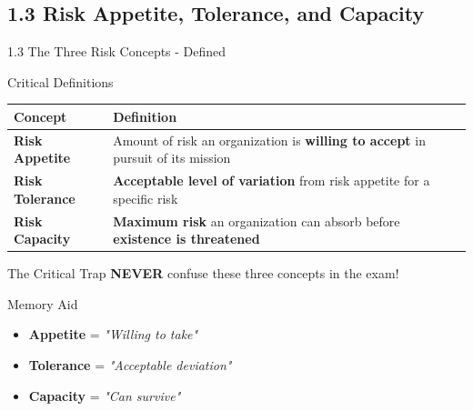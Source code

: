 \documentclass[10pt]{beamer}  %
\begin{document}
	\subsection{1.3 Risk Appetite, Tolerance, and Capacity}
	\begin{frame}{1.3 The Three Risk Concepts - Defined}
		\begin{block}{Critical Definitions}
			\begin{tabular}{|p{2.5cm}|p{8.5cm}|}
				\hline
				\textbf{Concept} & \textbf{Definition} \\
				\hline
				\textbf{Risk Appetite} & Amount of risk an organization is \textbf{willing to accept} in pursuit of its mission \\
				\hline
				\textbf{Risk Tolerance} & \textbf{Acceptable level of variation} from risk appetite for a specific risk \\
				\hline
				\textbf{Risk Capacity} & \textbf{Maximum risk} an organization can absorb before \textbf{existence is threatened} \\
				\hline
			\end{tabular}
		\end{block}
		
		\begin{alertblock}{The Critical Trap}
			\textbf{NEVER} confuse these three concepts in the exam!
		\end{alertblock}
		
		\begin{exampleblock}{Memory Aid}
			\begin{itemize}
				\item \textbf{Appetite} = \textit{"Willing to take"}
				\item \textbf{Tolerance} = \textit{"Acceptable deviation"}
				\item \textbf{Capacity} = \textit{"Can survive"}
			\end{itemize}
		\end{exampleblock}
	\end{frame}
	
\end{document}
